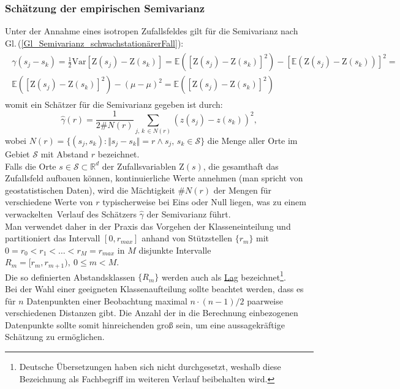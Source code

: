 \subsubsection{Schätzung der empirischen Semivarianz}
\label{KapitelTheorieVariogrammSchätzung}
Unter der Annahme eines isotropen Zufallsfeldes 
gilt für die Semivarianz nach Gl.\,(\ref{Gl_Semivarianz_schwachstationärerFall}):
\begin{eqnarray*}
\begin{gathered}
\gamma(s_j - s_k) = \frac{1}{2}\mathrm{Var} \left[
\mathrm{Z}(s_j) - \mathrm{Z}(s_k)  \right]=
\mathbb{E}\left( \left[ \mathrm{Z}(s_j) - \mathrm{Z}(s_k)
\right]^2 \right) - \left[ \mathbb{E}\left( 
\mathrm{Z}(s_j) - \mathrm{Z}(s_k) \right) \right]^2=\\
\mathbb{E}\left( \left[ \mathrm{Z}(s_j) - \mathrm{Z}(s_k)
\right]^2 \right) -\left( \mu -\mu \right)^2 =
\mathbb{E}\left( \left[ \mathrm{Z}(s_j) - \mathrm{Z}(s_k)
\right]^2 \right)
\end{gathered}
\end{eqnarray*}
womit ein Schätzer für die Semivarianz gegeben ist durch:
\begin{equation}
\label{Gl_Semivarianz_Schätzer_isotroperFall}
\hat{\gamma}(r)= \frac{1}{2\#N(r)} \sum_{j,\,k\, \in N(r)} \left( z(s_j) - z(s_k)\right)^2,
\end{equation}
wobei 
$N(r) = \lbrace (s_j, s_k) : \Vert s_j - s_k\Vert = r 
\wedge s_j,\,s_k \in \mathcal{S}\rbrace$ 
die Menge aller Orte im Gebiet $\mathcal{S}$ mit Abstand $r$
bezeichnet.\\

Falls die Orte $s \in \mathcal{S} \subset \mathbb{R}^d$ der
Zufallsvariablen $\mathrm{Z}(s)$, die gesamthaft das
Zufallsfeld aufbauen können, kontinuierliche Werte annehmen 
(man spricht von geostatistischen Daten), wird die Mächtigkeit 
$\#N(r)$ der Mengen für verschiedene Werte von $r$ typischerweise 
bei Eins oder Null liegen, was zu einem 
\glqq verwackelten\grqq\ Verlauf des
Schätzers $\hat{\gamma}$ der Semivarianz führt.\\

Man verwendet daher in der Praxis das Vorgehen der
 Klasseneinteilung und
partitioniert das Intervall $[0, r_{max}]$ anhand von
Stützstellen $\lbrace r_m\rbrace$ mit 
$0=r_0 < r_1 < \ldots < r_M=r_{max}$ in $M$  
disjunkte Intervalle $R_m=[r_m, r_{m+1}),\ 0 \leq m < M$.\\
Die so definierten Abstandsklassen $\lbrace R_m \rbrace$ werden 
auch als \underline{Lag} bezeichnet\footnote{Deutsche Übersetzungen
haben sich nicht durchgesetzt, weshalb diese Bezeichnung als
Fachbegriff im weiteren Verlauf beibehalten wird.}. \\
Bei der Wahl einer geeigneten Klassenaufteilung sollte beachtet 
werden, dass es für $n$ Datenpunkten einer Beobachtung
maximal $n\cdot(n-1)/2$ paarweise verschiedenen Distanzen gibt.
Die Anzahl der in die Berechnung einbezogenen Datenpunkte sollte 
somit hinreichenden groß sein, um eine aussagekräftige Schätzung zu ermöglichen. \\

